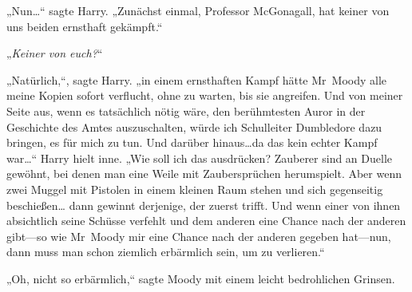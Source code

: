 „Nun…“ sagte Harry. „Zunächst einmal, Professor McGonagall, hat keiner von uns beiden ernsthaft gekämpft.“

„\emph{Keiner von euch?}“

„Natürlich,“, sagte Harry. „in einem ernsthaften Kampf hätte Mr~Moody alle meine Kopien sofort verflucht, ohne zu warten, bis sie angreifen. Und von meiner Seite aus, wenn es tatsächlich nötig wäre, den berühmtesten Auror in der Geschichte des Amtes auszuschalten, würde ich Schulleiter Dumbledore dazu bringen, es für mich zu tun. Und darüber hinaus…da das kein echter Kampf war…“ Harry hielt inne. „Wie soll ich das ausdrücken? Zauberer sind an Duelle gewöhnt, bei denen man eine Weile mit Zaubersprüchen herumspielt. Aber wenn zwei Muggel mit Pistolen in einem kleinen Raum stehen und sich gegenseitig beschießen… dann gewinnt derjenige, der zuerst trifft. Und wenn einer von ihnen absichtlich seine Schüsse verfehlt und dem anderen eine Chance nach der anderen gibt—so wie Mr~Moody mir eine Chance nach der anderen gegeben hat—nun, dann muss man schon ziemlich erbärmlich sein, um zu verlieren.“

„Oh, nicht so erbärmlich,“ sagte Moody mit einem leicht bedrohlichen Grinsen.

